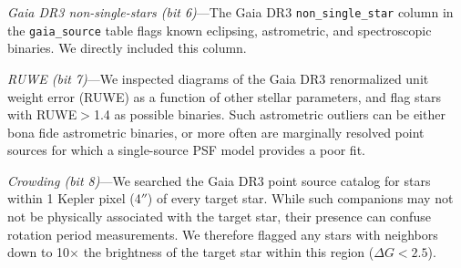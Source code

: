 \documentclass[11pt,twocolumn,tighten]{aastex63}
\begin{document}
{\it Gaia DR3 non-single-stars (bit 6)}---The Gaia DR3
\texttt{non\_single\_star} column in the \texttt{gaia\_source} table
flags known eclipsing, astrometric, and spectroscopic binaries.  We
directly included this column.

{\it RUWE (bit 7)}---We inspected diagrams of the Gaia DR3
renormalized unit weight error (RUWE) as a function of other stellar
parameters, and flag stars with RUWE$>$1.4 as possible binaries.  Such
astrometric outliers can be either bona fide astrometric binaries, or
more often are marginally resolved point sources for which a
single-source PSF model provides a poor fit.

{\it Crowding (bit 8)}---We searched the Gaia DR3 point source catalog
for stars within 1 Kepler pixel (4$''$) of every target star.  While
such companions may not not be physically associated with the target
star, their presence can confuse rotation period measurements.  We
therefore flagged any stars with neighbors down to 10$\times$ the
brightness of the target star within this region ($\Delta G < 2.5$).
\end{document}
